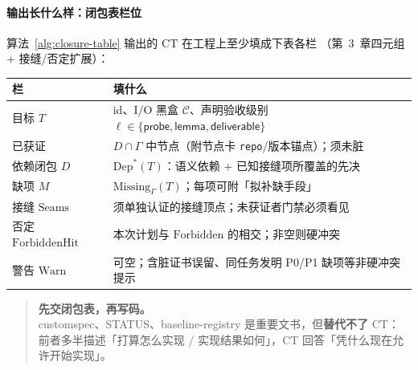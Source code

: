\documentclass[UTF8,a4paper,11pt]{ctexart}
\theoremstyle{definition}
\theoremstyle{plain}
\theoremstyle{remark}
\numberwithin{figure}{section}
\numberwithin{table}{section}
\begin{document}
\paragraph{输出长什么样：闭包表栏位}
算法~\ref{alg:closure-table} 输出的 $\mathrm{CT}$ 在工程上至少填成下表各栏
（第~3~章四元组 $+$ 接缝/否定扩展）：

\begin{center}
\begin{tabular}{@{}L{2.8cm}L{11.0cm}@{}}
  \toprule
  栏 & 填什么 \\
  \midrule
  目标 $T$ &
  id、I/O 黑盒 $\mathcal{C}$、声明验收级别 $\ell\in\{\mathsf{probe},\mathsf{lemma},\mathsf{deliverable}\}$ \\
  已获证 &
  $D\cap\Gamma$ 中节点（附节点卡 \texttt{repo}/版本锚点）；须未脏 \\
  依赖闭包 $D$ &
  $\mathrm{Dep}^*(T)$：语义依赖 + 已知接缝项所覆盖的先决 \\
  缺项 $M$ &
  $\mathrm{Missing}_\Gamma(T)$；每项可附「拟补缺手段」 \\
  接缝 $\mathrm{Seams}$ &
  须单独认证的接缝顶点；未获证者门禁必须看见 \\
  否定 $\mathrm{ForbiddenHit}$ &
  本次计划与 $\mathrm{Forbidden}$ 的相交；非空则硬冲突 \\
  警告 $\mathrm{Warn}$ &
  可空；含脏证书误留、同任务发明 P0/P1 缺项等非硬冲突提示 \\
  \bottomrule
\end{tabular}
\end{center}

\begin{quote}
\noindent
\textbf{先交闭包表，再写码。}\\
customspec、STATUS、baseline-registry 是重要文书，但\textbf{替代不了} $\mathrm{CT}$：
前者多半描述「打算怎么实现 / 实现结果如何」，$\mathrm{CT}$ 回答「凭什么现在允许开始实现」。
\end{quote}
\end{document}
